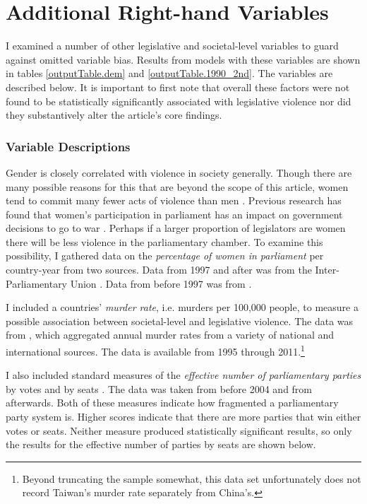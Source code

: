 \documentclass[a4paper]{article}\usepackage[]{graphicx}\usepackage[]{color}
\begin{document}
\section*{Additional Right-hand Variables}


I examined a number of other legislative and societal-level variables to guard against omitted variable bias. Results from models with these variables are shown in tables \ref{outputTable.dem} and \ref{outputTable.1990_2nd}. The variables are described below. It is important to first note that overall these factors were not found to be statistically significantly associated with legislative violence nor did they substantively alter the article's core findings.

\subsubsection*{Variable Descriptions}

Gender is closely correlated with violence in society generally. Though there are many possible reasons for this that are beyond the scope of this article, women tend to commit many fewer acts of violence than men \citep[]{Schwartz2009}. Previous research has found that women's participation in parliament has an impact on government decisions to go to war \citep{Melander2005}. Perhaps if a larger proportion of legislators are women there will be less violence in the parliamentary chamber. To examine this possibility, I gathered data on the \emph{percentage of women in parliament} per country-year from two sources. Data from 1997 and after was from the Inter-Parliamentary Union \citeyearpar{IPU2013}. Data from before 1997 was from \cite{Schwartz2009}.

I included a countries' \emph{murder rate}, i.e. murders per 100,000 people, to measure a possible association between societal-level and legislative violence. The data was from \cite{UNMurder2013}, which aggregated annual murder rates from a variety of national and international sources. The data is available from 1995 through 2011.\footnote{Beyond truncating the sample somewhat, this data set unfortunately does not record Taiwan's murder rate separately from China's.}

I also included standard measures of the \emph{effective number of parliamentary parties} by votes and by seats \citep[]{Laakso1979, Taagepera1989}. The data was taken from \cite{Carey2011} before 2004 and from \cite{Gallagher2012} afterwards. Both of these measures indicate how fragmented a parliamentary party system is. Higher scores indicate that there are more parties that win either votes or seats. Neither measure produced statistically significant results, so only the results for the effective number of parties by seats are shown below.
\end{document}
